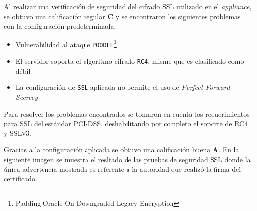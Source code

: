 Al realizar una verificaci\'{o}n de seguridad del cifrado \textsc{SSL} utilizado en el \textsl{appliance}, se obtuvo una calificaci\'{o}n regular \textbf{C} y se encontraron los siguientes problemas con la configuraci\'{o}n predeterminada:

\begin{itemize}
  \item Vulnerabilidad al ataque \texttt{POODLE}\footnote{Padding Oracle On Downgraded Legacy Encryption} \cite{_ssl_????-1} \cite{_ssl-poodle_????} \cite{_this_????} \cite{barnes_poodle_????} \cite{_security_????-1}

  \item El servidor soporta el algoritmo cifrado \texttt{RC4}, mismo que es clasificado como d\'{e}bil \cite{_security_????}

  \item La configuraci\'{o}n de \texttt{SSL} aplicada no permite el uso de \textsl{Perfect Forward Secrecy} \cite{_forward_2016}
\end{itemize}


Para resolver los problemas encontrados se tomaron en cuenta los requerimientos para \textsc{SSL} del est\'{a}ndar \textsc{PCI-DSS}, deshabilitando por completo el soporte de \textsc{RC4} y \textsc{SSLv3}.

Gracias a la configuraci\'{o}n aplicada se obtuvo una calificaci\'{o}n buena \textbf{A}. En la siguiente imagen se muestra el resltado de las pruebas de seguridad SSL donde la \'{u}nica advertencia mostrada es referente a la autoridad que realiz\'{o} la firma del certificado. \cite{_ssl_????}


